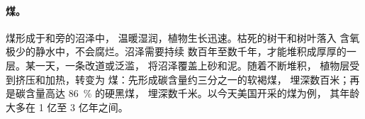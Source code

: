 \paragraph{煤。} 煤形成于和旁的沼泽中，
温暖湿润，植物生长迅速。枯死的树干和树叶落入
含氧极少的静水中，不会腐烂。沼泽需要持续
数百年至数千年，才能堆积成厚厚的一层。某一天，一条改道或泛滥，
将沼泽覆盖上砂和泥。随着不断堆积，
植物层受到挤压和加热，转变为
煤：先形成碳含量约三分之一的软褐煤，
埋深数百米；再是碳含量高达 86~\% 的硬黑煤，
埋深数千米。以今天美国开采的煤为例，
其年龄大多在 1 亿至 3 亿年之间。

